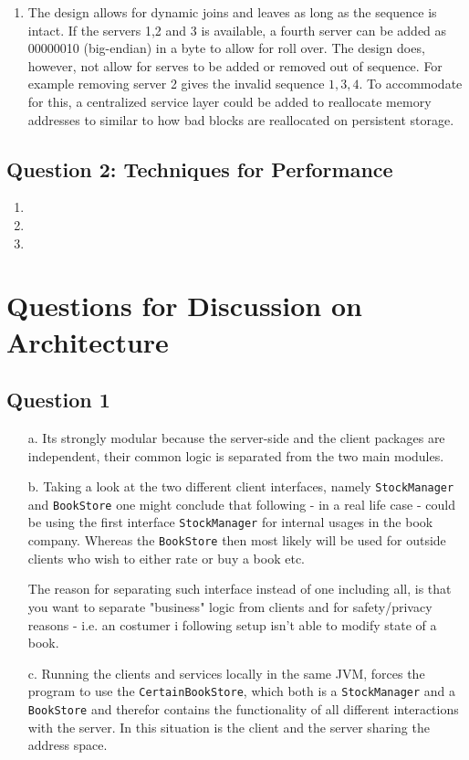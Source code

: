\documentclass[10pt,a4paper]{article}
\begin{document}
\begin{enumerate}
	\item The design allows for dynamic joins and leaves as long as the sequence is intact. If the servers 1,2 and 3 is available, a fourth server can be added as 00000010 (big-endian) in a byte to allow for roll over. The design does, however, not allow for serves to be added or removed out of sequence. For example removing server 2 gives the invalid sequence $1,3,4$. To accommodate for this, a centralized service layer could be added to reallocate memory addresses to similar to how bad blocks are reallocated on persistent storage.
	
	
\end{enumerate}

\subsection*{Question 2: Techniques for Performance}
\begin{enumerate}
	\item 
	\item
	\item
\end{enumerate}

\section*{Questions for Discussion on Architecture}
\subsection*{Question 1}
\begin{itemize}
	\item[a.] Its strongly modular because the server-side and the client packages are independent, their common logic is separated from the two main modules.
	\item[b.] Taking a look at the two different client interfaces, namely \texttt{StockManager} and \texttt{BookStore} one might conclude that following - in a real life case - could be using the first interface \texttt{StockManager} for internal usages in the book company. Whereas the \texttt{BookStore} then most likely will be used for outside clients who wish to either rate or buy a book etc.
	\newline
	
	The reason for separating such interface instead of one including all, is that you want to separate "business" logic from clients and for safety/privacy reasons - i.e. an costumer i following setup isn't able to modify state of a book.
	\item[c.] Running the clients and services locally in the same JVM, forces the program to use the \texttt{CertainBookStore}, which both is a \texttt{StockManager} and a \texttt{BookStore} and therefor contains the functionality of all different interactions with the server. In this situation is the client and the server sharing the address space.
\end{itemize}
\end{document}
